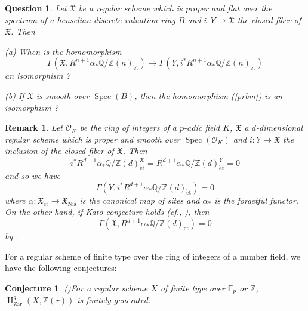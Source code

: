 \documentclass{article}
\newtheorem{con}[thm]{\indent \sc Conjecture}
\newtheorem{rem}[thm]{\indent \sc Remark}
\newtheorem{Qu}[thm]{\indent \sc Question}
\newcommand{\spec}{\operatorname{Spec}}
\newcommand{\et}{\mathrm{\acute{e}t}}
\newcommand{\Nis}{\mathrm{Nis}}
\newcommand{\Zar}{\mathrm{Zar}}
\newcommand{\HO}{\operatorname{H}}
\begin{document}
%
\begin{Qu}\upshape\label{Qpr}
Let $\mathfrak{X}$ be a regular scheme which is proper and flat over the spectrum of   
a henselian discrete valuation ring $B$ and 
$i: Y\to \mathfrak{X}$ the closed fiber of $\mathfrak{X}$. Then
%
\begin{description}
%
\item{(a)} When is the homomorphism
%
\begin{equation}\label{prbm}
\Gamma\left(
\mathfrak{X},
R^{n+1}\alpha_{*}\mathbb{Q}/\mathbb{Z}(n)_{\et}
\right)
\to
\Gamma\left(
Y,
i^{*}R^{n+1}\alpha_{*}\mathbb{Q}/\mathbb{Z}(n)_{\et}
\right)
\end{equation}
%
an isomorphism ?
%
\item{(b)} If $\mathfrak{X}$ is smooth over $\spec(B)$, then
the homomorphism (\ref{prbm}) is an isomorphism ?
\end{description}
%
\end{Qu}
%

%
\begin{rem}\upshape
Let $\mathcal{O}_{K}$ be the ring of integers of a $p$-adic field $K$,
$\mathfrak{X}$ a $d$-dimensional regular scheme which is proper and smooth over
$\spec(\mathcal{O}_{K})$ and $i: Y\to \mathfrak{X}$ the inclusion of the closed fiber of $\mathfrak{X}$. 
Then
%
\begin{equation*}
i^{*}R^{d+1}\alpha_{*}\mathbb{Q}/\mathbb{Z}(d)^{\mathfrak{X}}_{\et}
=
R^{d+1}\alpha_{*}\mathbb{Q}/\mathbb{Z}(d)^{Y}_{\et}=0   
\end{equation*}
%
and so we have
%
\begin{equation*}
\Gamma\left(
Y,
i^{*}R^{d+1}\alpha_{*}
\mathbb{Q}/\mathbb{Z}(d)_{\et}
\right)
=0
\end{equation*}
%
where 
$\alpha: \mathfrak{X}_{\et}\to \mathfrak{X}_{\Nis}$
is the canonical map of sites and
$\alpha_{*}$ is the forgetful functor. 
On the other hand, if Kato conjecture holds 
(cf.\cite[p.125, Conjecture 0.2]{K-S}, \cite[p.125, Theorem 0.4]{K-S}),
then
%
\begin{equation*}
\Gamma\left(
\mathfrak{X},
R^{d+1}\alpha_{*}
\mathbb{Q}/\mathbb{Z}(d)_{\et}
\right)
=0
\end{equation*}
%
by \cite[p.51, Theorem 4.6]{SM}.
\end{rem}
%




For a regular scheme of finite type over
the ring of integers of a number field,
we have the following conjectures:

%
\begin{con}\upshape(\cite[Conjecture 2.1]{Sai})\label{ConjF}
For a regular scheme $X$ of finite type over  
$\mathbb{F}_{p}$ or $\mathbb{Z}$,
$\HO_{\Zar}^{q}(X, \mathbb{Z}(r))$
is finitely generated.
\end{con}
%
\end{document}
